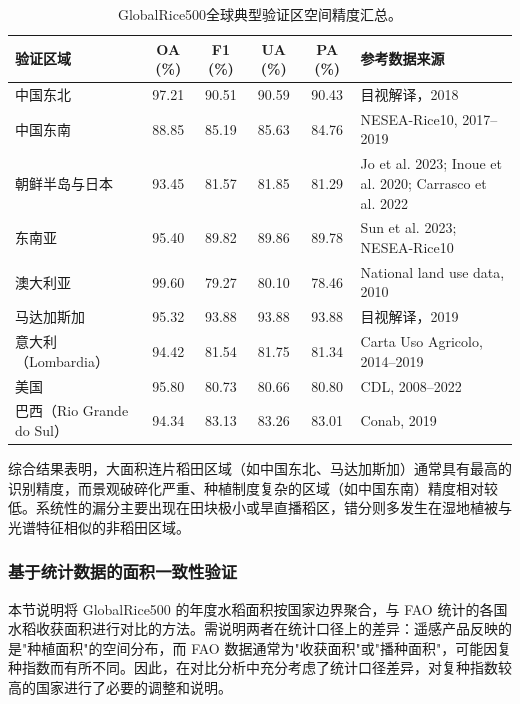 \begin{table}[htbp]
    \centering
    \caption{GlobalRice500全球典型验证区空间精度汇总。}
    \label{tab:validation_summary}
    \small
    \begin{tabular}{lccccp{5.2cm}}
        \toprule
        验证区域 & OA (\%) & F1 (\%) & UA (\%) & PA (\%) & 参考数据来源 \\
        \midrule
        中国东北 & 97.21 & 90.51 & 90.59 & 90.43 & 目视解译，2018 \\
        中国东南 & 88.85 & 85.19 & 85.63 & 84.76 & NESEA-Rice10, 2017--2019 \\
        朝鲜半岛与日本 & 93.45 & 81.57 & 81.85 & 81.29 & Jo et al. 2023; Inoue et al. 2020; Carrasco et al. 2022 \\
        东南亚 & 95.40 & 89.82 & 89.86 & 89.78 & Sun et al. 2023; NESEA-Rice10 \\
        澳大利亚 & 99.60 & 79.27 & 80.10 & 78.46 & National land use data, 2010 \\
        马达加斯加 & 95.32 & 93.88 & 93.88 & 93.88 & 目视解译，2019 \\
        意大利（Lombardia） & 94.42 & 81.54 & 81.75 & 81.34 & Carta Uso Agricolo, 2014--2019 \\
        美国 & 95.80 & 80.73 & 80.66 & 80.80 & CDL, 2008--2022 \\
        巴西（Rio Grande do Sul） & 94.34 & 83.13 & 83.26 & 83.01 & Conab, 2019 \\
        \bottomrule
    \end{tabular}
\end{table}

综合结果表明，大面积连片稻田区域（如中国东北、马达加斯加）通常具有最高的识别精度，而景观破碎化严重、种植制度复杂的区域（如中国东南）精度相对较低。系统性的漏分主要出现在田块极小或旱直播稻区，错分则多发生在湿地植被与光谱特征相似的非稻田区域。



\subsubsection{基于统计数据的面积一致性验证}


本节说明将 GlobalRice500 的年度水稻面积按国家边界聚合，与 FAO 统计的各国水稻收获面积进行对比的方法。需说明两者在统计口径上的差异：遥感产品反映的是"种植面积"的空间分布，而 FAO 数据通常为"收获面积"或"播种面积"，可能因复种指数而有所不同。因此，在对比分析中充分考虑了统计口径差异，对复种指数较高的国家进行了必要的调整和说明。

